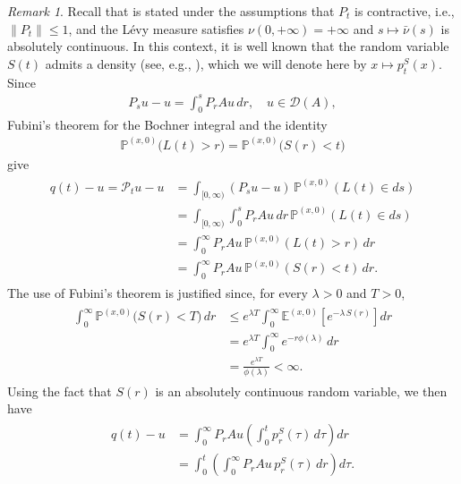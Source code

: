 \documentclass[reqno]{amsart}
\theoremstyle{remark}
\newtheorem{remark}[theorem]{Remark}
\numberwithin{equation}{section} %
\newcommand{\DD}{\mathcal{D}}
\newcommand{\1}{\mathds{1}}
\begin{document}
\begin{remark}
		Recall that \cite[Theorem 5.1]{toaldo_pota} is stated under the assumptions that $P_t$ is contractive, i.e., $\|P_t\|\le 1$, and the L\'evy measure satisfies $\nu(0, +\infty)= +\infty$ and $s \mapsto \bar{\nu}(s)$ is absolutely continuous.  In this context, it is well known that the random variable $S(t)$ admits a density (see, e.g., \cite[Theorem 27.7]{sato}), which we will denote here by $x \mapsto p_t^S(x)$.
		Since
		\begin{align}
			P_su-u=\int_0^s P_rAu\,dr,\quad u\in \DD(A),
		\end{align}
		Fubini's theorem for the Bochner integral and the identity
		\begin{align}
			\mathds {P}^{(x,0)}\bigl(L(t)>r\bigr)
			=
			\mathds {P}^{(x,0)}\bigl(S(r)<t\bigr)
		\end{align}
		give
		\begin{align}
			\begin{aligned}
				q(t)-u=\mathcal P_tu-u
				&=
				\int_{[0,\infty)}(P_su-u)\,\mathds{P}^{(x,0)}(L(t) \in ds)\\
				&=
				\int_{[0,\infty)}
				\int_0^s P_rAu\,dr\,\mathds{P}^{(x,0)}(L(t) \in ds)\\
				&=
				\int_0^\infty
				P_rAu\,\mathds{P}^{(x,0)}(L(t) >r)\,dr\\
				&=
				\int_0^\infty
				P_rAu\,\mathds{P}^{(x,0)}(S(r) <t)\,dr.
			\end{aligned}
			\label{attempt}
		\end{align}
		The use of Fubini's theorem is justified since, for every $\lambda>0$ and $T>0$,
		\begin{align}
			\begin{aligned}
				\int_0^\infty
				\mathds{P}^{(x,0)}\bigl(S(r)<T\bigr)\,dr
				&\leq
				e^{\lambda T}
				\int_0^\infty
				\mathds {E}^{(x,0)}\!\left[e^{-\lambda \, S(r)}\right]dr\\
				&=
				e^{\lambda T}
				\int_0^\infty e^{-r \phi(\lambda)}\,dr\\
				&=
				\frac{e^{\lambda T}}{\phi(\lambda)}
				<\infty.
			\end{aligned}
		\end{align}
		Using the fact that $S(r)$ is an absolutely continuous random variable, we then have
		\begin{align}
			\begin{aligned}
				q(t)-u
				&=
				\int_0^\infty
				P_rAu\left(\int_0^t p_r^S(\tau)\,d\tau\right)dr\\
				&=
				\int_0^t
				\left(\int_0^\infty P_rAu\,p_r^S(\tau)\,dr\right)d\tau.

\end{aligned}
\end{align}
\end{remark}
\end{document}
